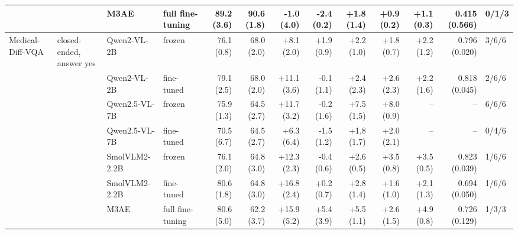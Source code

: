 \begin{table}[t]
\begin{tabular}{llllrrrrrrrrl}
 &  & M3AE & full fine-tuning & 89.2 (3.6) & 90.6 (1.8) & -1.0 (4.0) & -2.4 (0.2) & +1.8 (1.4) & +0.9 (0.2) & +1.1 (0.3) & 0.415 (0.566) & 0/1/3 \\
\midrule
Medical-Diff-VQA & closed-ended, answer yes & Qwen2-VL-2B & frozen & 76.1 (0.8) & 68.0 (2.0) & +8.1 (2.0) & +1.9 (0.9) & +2.2 (1.0) & +1.8 (0.7) & +2.2 (1.2) & 0.796 (0.020) & 3/6/6 \\
 &  & Qwen2-VL-2B & fine-tuned & 79.1 (2.5) & 68.0 (2.0) & +11.1 (3.6) & -0.1 (1.1) & +2.4 (2.3) & +2.6 (2.3) & +2.2 (1.6) & 0.818 (0.045) & 2/6/6 \\
 &  & Qwen2.5-VL-7B & frozen & 75.9 (1.3) & 64.5 (2.7) & +11.7 (3.2) & -0.2 (1.6) & +7.5 (1.5) & +8.0 (0.9) & -- & -- & 6/6/6 \\
 &  & Qwen2.5-VL-7B & fine-tuned & 70.5 (6.7) & 64.5 (2.7) & +6.3 (6.4) & -1.5 (1.2) & +1.8 (1.7) & +2.0 (2.1) & -- & -- & 0/4/6 \\
 &  & SmolVLM2-2.2B & frozen & 76.1 (2.0) & 64.8 (3.0) & +12.3 (2.3) & -0.4 (0.6) & +2.6 (0.5) & +3.5 (0.8) & +3.5 (0.5) & 0.823 (0.039) & 1/6/6 \\
 &  & SmolVLM2-2.2B & fine-tuned & 80.6 (1.8) & 64.8 (3.0) & +16.8 (2.4) & +0.2 (0.7) & +2.8 (1.4) & +1.6 (1.0) & +2.1 (1.3) & 0.694 (0.050) & 1/6/6 \\
 &  & M3AE & full fine-tuning & 80.6 (5.0) & 62.2 (3.7) & +15.9 (5.2) & +5.4 (3.9) & +5.5 (1.1) & +2.6 (1.5) & +4.9 (0.8) & 0.726 (0.129) & 1/3/3 \\
\bottomrule
\end{tabular}
\end{table}
